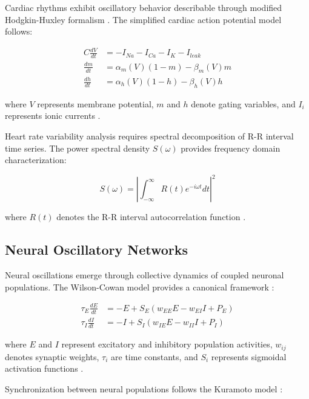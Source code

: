 \documentclass[twocolumn]{article}
\begin{document}
Cardiac rhythms exhibit oscillatory behavior describable through modified Hodgkin-Huxley formalism \citep{hodgkin1952quantitative}. The simplified cardiac action potential model follows:

\begin{align}
C\frac{dV}{dt} &= -I_{Na} - I_{Ca} - I_K - I_{leak} \label{eq:cardiac_membrane}\\
\frac{dm}{dt} &= \alpha_m(V)(1-m) - \beta_m(V)m \label{eq:cardiac_m}\\
\frac{dh}{dt} &= \alpha_h(V)(1-h) - \beta_h(V)h \label{eq:cardiac_h}
\end{align}

where $V$ represents membrane potential, $m$ and $h$ denote gating variables, and $I_i$ represents ionic currents \citep{keener2009mathematical}.

Heart rate variability analysis requires spectral decomposition of R-R interval time series. The power spectral density $S(\omega)$ provides frequency domain characterization:

\begin{equation}
S(\omega) = \left|\int_{-\infty}^{\infty} R(t) e^{-i\omega t} dt\right|^2
\label{eq:psd}
\end{equation}

where $R(t)$ denotes the R-R interval autocorrelation function \citep{task1996heart}.

\subsection{Neural Oscillatory Networks}

Neural oscillations emerge through collective dynamics of coupled neuronal populations. The Wilson-Cowan model provides a canonical framework \citep{wilson1972excitatory}:

\begin{align}
\tau_E \frac{dE}{dt} &= -E + S_E(w_{EE}E - w_{EI}I + P_E) \label{eq:wilson_cowan_E}\\
\tau_I \frac{dI}{dt} &= -I + S_I(w_{IE}E - w_{II}I + P_I) \label{eq:wilson_cowan_I}
\end{align}

where $E$ and $I$ represent excitatory and inhibitory population activities, $w_{ij}$ denotes synaptic weights, $\tau_i$ are time constants, and $S_i$ represents sigmoidal activation functions \citep{dayan2001theoretical}.

Synchronization between neural populations follows the Kuramoto model \citep{kuramoto1984chemical}:
\end{document}
